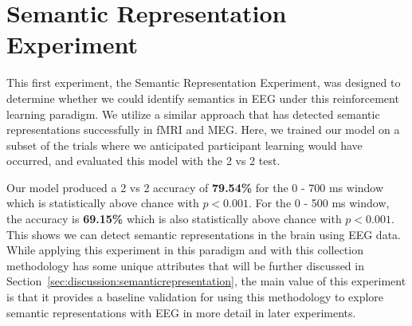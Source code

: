 \section{Semantic Representation Experiment}

This first experiment, the Semantic Representation Experiment, was designed to 
determine whether we could identify semantics in EEG under this reinforcement 
learning paradigm. We utilize a similar approach that has detected semantic 
representations successfully in fMRI and MEG. Here, we trained our model on a 
subset of the trials where we anticipated participant learning would have 
occurred, and evaluated this model with the 2 vs 2 test. 

Our model produced a 2 vs 2 accuracy of \textbf{79.54\%} for the 0 - 700 ms 
window which is statistically above chance with $p < 0.001$. For the 0 - 500 ms 
window, the \tvt accuracy is \textbf{69.15\%} which is also statistically above 
chance with $p < 0.001$. This shows we can detect semantic representations in 
the brain using EEG data.  While applying this experiment in this paradigm and 
with this collection methodology has some unique attributes that will be 
further discussed in Section~\ref{sec:discussion:semanticrepresentation}, the 
main value of this experiment is that it provides a baseline validation for 
using this methodology to explore semantic representations with EEG in more 
detail in later experiments. 

